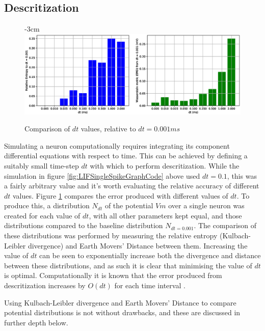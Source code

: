 \subsection{Descritization}

\begin{figure}[h!]
    \centering
    \addtolength{\leftskip} {-3cm}
    \addtolength{\rightskip}{-3cm}
    \includegraphics[width=1.4\linewidth]{figures/graphs/entropyofdt.eps}
    \caption{Comparison of $dt$ values, relative to $dt=0.001ms$}
    \label{fig:entropyofdt}
\end{figure}

Simulating a neuron computationally requires integrating its component
differential equations with respect to time. This can be achieved by defining a
suitably small time-step $dt$ with which to perform descritization. While the
simulation in figure \ref{fig:LIFSingleSpikeGraphCode} above used $dt = 0.1$,
this was a fairly arbitrary value and it's worth evaluating the relative
accuracy of different $dt$ values. Figure \ref{fig:entropyofdt} compares the
error produced with different values of $dt$. To
produce this, a distribution $N_{dt}$ of the potential $Vm$ over a single neuron
was created for each value of $dt$, with all other parameters kept equal, and those distributions compared to the
baseline distribution $N_{dt=0.001}$. The comparison of these distributions was
performed by measuring the relative entropy (Kulbach-Leibler divergence) and
Earth Movers' Distance between them. Increasing the value of $dt$ can be seen to
exponentially increase both the divergence and distance between these
distributions, and as such it is clear that minimising the value of $dt$ is
optimal. Computationally it is known that the error produced from descritization
increases by $O(dt)$ for each time interval \autocite{brette_simulation_2007}.

Using Kulbach-Leibler divergence and Earth Movers' Distance to compare potential
distributions is not without drawbacks, and these are discussed in further depth
below.

